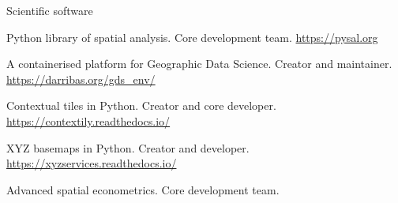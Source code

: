\documentclass[12pt,2up]{article}
\begin{document}
\begin{cv}{}
\begin{cvlist}{Scientific software}
\item[\underline{PySAL}] Python library of spatial analysis. Core development
    team. \url{https://pysal.org}
\item[\underline{\texttt{gds\_env}}] A containerised platform for Geographic
    Data Science. Creator and maintainer. \url{https://darribas.org/gds_env/}
\item[\underline{\texttt{contextily}}] Contextual tiles in Python. Creator and core developer. \url{https://contextily.readthedocs.io/}
\item[\underline{\texttt{xyzservices}}] XYZ basemaps in Python. Creator and developer. \url{https://xyzservices.readthedocs.io/}
\item[\underline{GeoDaSpace}] Advanced spatial econometrics. Core development
    team. 


\end{cvlist}
\end{cv}
\end{document}
